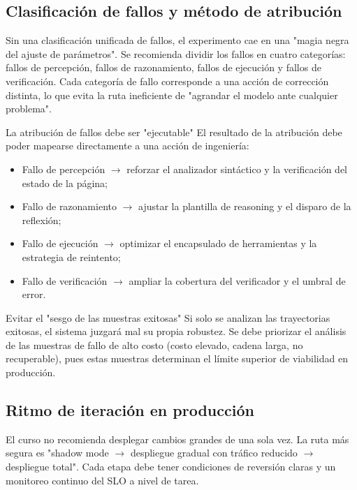 \subsection{Clasificación de fallos y método de atribución}
Sin una clasificación unificada de fallos, el experimento cae en una "magia negra del ajuste de parámetros". Se recomienda dividir los fallos en cuatro categorías: fallos de percepción, fallos de razonamiento, fallos de ejecución y fallos de verificación. Cada categoría de fallo corresponde a una acción de corrección distinta, lo que evita la ruta ineficiente de "agrandar el modelo ante cualquier problema".

\begin{importantbox}{La atribución de fallos debe ser "ejecutable"}
El resultado de la atribución debe poder mapearse directamente a una acción de ingeniería:
\begin{itemize}
    \item Fallo de percepción $\rightarrow$ reforzar el analizador sintáctico y la verificación del estado de la página;
    \item Fallo de razonamiento $\rightarrow$ ajustar la plantilla de reasoning y el disparo de la reflexión;
    \item Fallo de ejecución $\rightarrow$ optimizar el encapsulado de herramientas y la estrategia de reintento;
    \item Fallo de verificación $\rightarrow$ ampliar la cobertura del verificador y el umbral de error.
\end{itemize}
\end{importantbox}

\begin{warningbox}{Evitar el "sesgo de las muestras exitosas"}
Si solo se analizan las trayectorias exitosas, el sistema juzgará mal su propia robustez. Se debe priorizar el análisis de las muestras de fallo de alto costo (costo elevado, cadena larga, no recuperable), pues estas muestras determinan el límite superior de viabilidad en producción.
\end{warningbox}

\subsection{Ritmo de iteración en producción}
El curso no recomienda desplegar cambios grandes de una sola vez. La ruta más segura es "shadow mode $\rightarrow$ despliegue gradual con tráfico reducido $\rightarrow$ despliegue total". Cada etapa debe tener condiciones de reversión claras y un monitoreo continuo del SLO a nivel de tarea.

